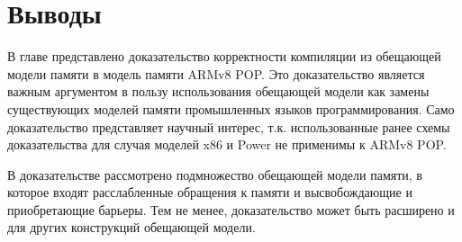 \section{Выводы}
В главе представлено доказательство корректности компиляции из обещающей
модели памяти в модель памяти ARMv8 POP. Это доказательство является важным аргументом
в пользу использования обещающей модели как замены существующих моделей памяти
промышленных языков программирования.
Само доказательство представляет научный интерес, т.к. использованные ранее схемы
доказательства для случая моделей x86 и Power не применимы к ARMv8 POP.

В доказательстве рассмотрено подмножество обещающей модели памяти, в которое входят
расслабленные обращения к памяти и высвобождающие и приобретающие барьеры.
Тем не менее, доказательство может быть расширено и для других конструкций обещающей модели.
